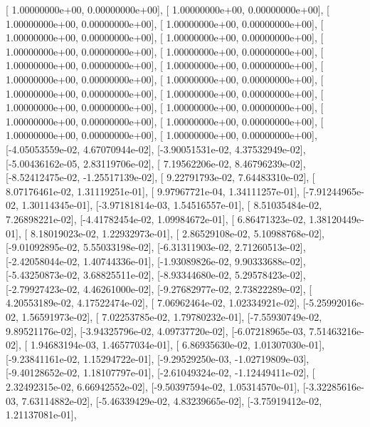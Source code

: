\documentclass{article}
\begin{document}
       [ 1.00000000e+00,  0.00000000e+00],
       [ 1.00000000e+00,  0.00000000e+00],
       [ 1.00000000e+00,  0.00000000e+00],
       [ 1.00000000e+00,  0.00000000e+00],
       [ 1.00000000e+00,  0.00000000e+00],
       [ 1.00000000e+00,  0.00000000e+00],
       [ 1.00000000e+00,  0.00000000e+00],
       [ 1.00000000e+00,  0.00000000e+00],
       [ 1.00000000e+00,  0.00000000e+00],
       [ 1.00000000e+00,  0.00000000e+00],
       [ 1.00000000e+00,  0.00000000e+00],
       [ 1.00000000e+00,  0.00000000e+00],
       [ 1.00000000e+00,  0.00000000e+00],
       [ 1.00000000e+00,  0.00000000e+00],
       [ 1.00000000e+00,  0.00000000e+00],
       [ 1.00000000e+00,  0.00000000e+00],
       [ 1.00000000e+00,  0.00000000e+00],
       [ 1.00000000e+00,  0.00000000e+00],
       [ 1.00000000e+00,  0.00000000e+00],
       [ 1.00000000e+00,  0.00000000e+00],
       [-4.05053559e-02,  4.67070944e-02],
       [-3.90051531e-02,  4.37532949e-02],
       [-5.00436162e-05,  2.83119706e-02],
       [ 7.19562206e-02,  8.46796239e-02],
       [-8.52412475e-02, -1.25517139e-02],
       [ 9.22791793e-02,  7.64483310e-02],
       [ 8.07176461e-02,  1.31119251e-01],
       [ 9.97967721e-04,  1.34111257e-01],
       [-7.91244965e-02,  1.30114345e-01],
       [-3.97181814e-03,  1.54516557e-01],
       [ 8.51035484e-02,  7.26898221e-02],
       [-4.41782454e-02,  1.09984672e-01],
       [ 6.86471323e-02,  1.38120449e-01],
       [ 8.18019023e-02,  1.22932973e-01],
       [ 2.86529108e-02,  5.10988768e-02],
       [-9.01092895e-02,  5.55033198e-02],
       [-6.31311903e-02,  2.71260513e-02],
       [-2.42058044e-02,  1.40744336e-01],
       [-1.93089826e-02,  9.90333688e-02],
       [-5.43250873e-02,  3.68825511e-02],
       [-8.93344680e-02,  5.29578423e-02],
       [-2.79927423e-02,  4.46261000e-02],
       [-9.27682977e-02,  2.73822289e-02],
       [ 4.20553189e-02,  4.17522474e-02],
       [ 7.06962464e-02,  1.02334921e-02],
       [-5.25992016e-02,  1.56591973e-02],
       [ 7.02253785e-02,  1.79780232e-01],
       [-7.55930749e-02,  9.89521176e-02],
       [-3.94325796e-02,  4.09737720e-02],
       [-6.07218965e-03,  7.51463216e-02],
       [ 1.94683194e-03,  1.46577034e-01],
       [ 6.86935630e-02,  1.01307030e-01],
       [-9.23841161e-02,  1.15294722e-01],
       [-9.29529250e-03, -1.02719809e-03],
       [-9.40128652e-02,  1.18107797e-01],
       [-2.61049324e-02, -1.12449411e-02],
       [ 2.32492315e-02,  6.66942552e-02],
       [-9.50397594e-02,  1.05314570e-01],
       [-3.32285616e-03,  7.63114882e-02],
       [-5.46339429e-02,  4.83239665e-02],
       [-3.75919412e-02,  1.21137081e-01],
\end{document}

